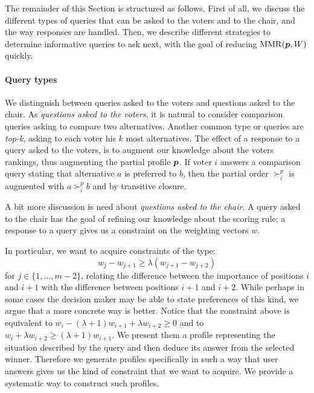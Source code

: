 The remainder of this Section is structured as follows.
First of all, we discuss the different types of queries that can be asked to the voters and to the chair, and the way responses are handled.
Then, we describe different strategies to determine informative queries to ask next, with the goal of reducing $\operatorname{MMR}(\bm{p},W)$ quickly.


\paragraph{Query types}
We distinguish between queries asked to the voters and questions asked to the chair.
As {\em questions asked to the voters}, it is natural to consider comparison queries asking to compare two alternatives.
Another common type or queries are {\em top-k}, asking to each voter his $k$ most alternatives.
The effect of a response to a query asked to the voters, is to augment our knowledge about the voters rankings, thus augmenting the partial profile $\bm{p}$. 
If voter $i$ answers a comparison query stating that alternative $a$ is preferred to $b$, then the partial order $\succ^{p}_{i}$ is augmented with $a \succ^{p}_{i} b$ and by transitive closure.

A bit more discussion is need about {\em questions asked to the chair}.
A query asked to the chair has the goal of refining our knowledge about the scoring rule;
a response to a query gives us a constraint on the weighting vectors $w$.

In particular, we want to acquire constraints of the type:
\[ w_{j} - w_{j+1} \geq \lambda (w_{j+1} - w_{j+2}) \] 
for $j \in \{1,\ldots,m-2\}$, relating the difference between the importance of positions $i$ and $i+1$ with the difference between positions $i+1$ and $i+2$.
While perhaps in some cases the decision maker may be able to state preferences of this kind, we argue that a more concrete way is better.
Notice that the constraint above is equivalent to 
$w_{i} - (\lambda+1) w_{i+1} + \lambda w_{i+2} \geq 0$
and to $w_{i} + \lambda w_{i+2} \geq  (\lambda+1) w_{i+1}$.
We present them a profile representing the situation described by the query and then deduce its answer from the selected winner. 
Therefore we generate profiles specifically in such a way that user answers gives us the kind of constraint that we want to acquire.
We provide a systematic way to construct such profiles.  %

